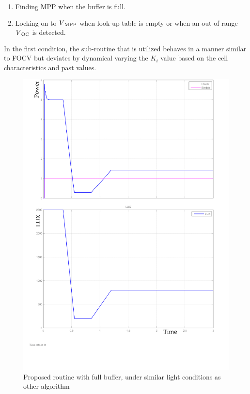 	\begin{enumerate}
		\item Finding \ac{MPP} when the buffer is full.
		\item Locking on to $V\textsubscript{MPP}$ when look-up table is empty or when an out of range $V\textsubscript{OC}$ is detected.				
	\end{enumerate}
In the first condition, the sub-routine that is utilized behaves in a manner similar to \ac{FOCV} but deviates by dynamical varying the $K_{i}$ value based on the cell characteristics and past values.    
   \begin{figure}[H]
  	  \begin{center}
  		  \includegraphics[width=\textwidth]{images/Proposed_algo-1}
  		  \caption{Proposed routine with full buffer, under similar light conditions as other algorithm}
  		  \label{fig:Frac_oc_result}
  	  \end{center}
    \end{figure}

